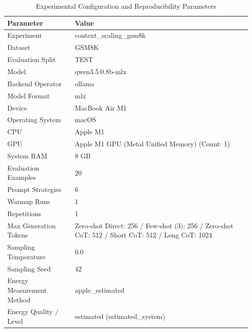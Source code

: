 \begin{table}
\caption{Experimental Configuration and Reproducibility Parameters}
\label{tab:experimental_configuration}
\begin{tabular}{ll}
\toprule
Parameter & Value \\
\midrule
Experiment & context\_scaling\_gsm8k \\
Dataset & GSM8K \\
Evaluation Split & TEST \\
Model & qwen3.5:0.8b-mlx \\
Backend Operator & ollama \\
Model Format & mlx \\
Device & MacBook Air M1 \\
Operating System & macOS \\
CPU & Apple M1 \\
GPU & Apple M1 GPU (Metal Unified Memory) (Count: 1) \\
System RAM & 8 GB \\
Evaluation Examples & 20 \\
Prompt Strategies & 6 \\
Warmup Runs & 1 \\
Repetitions & 1 \\
Max Generation Tokens & Zero-shot Direct: 256 / Few-shot (3): 256 / Zero-shot CoT: 512 / Short CoT: 512 / Long CoT: 1024 \\
Sampling Temperature & 0.0 \\
Sampling Seed & 42 \\
Energy Measurement Method & apple\_estimated \\
Energy Quality / Level & estimated (estimated\_system) \\
\bottomrule
\end{tabular}
\end{table}
